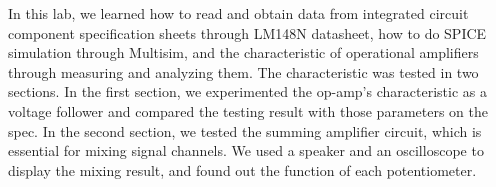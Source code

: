 In this lab, we learned how to read and obtain data from integrated circuit component specification sheets through LM148N datasheet, how to do SPICE simulation through Multisim, and the characteristic of operational amplifiers through measuring and analyzing them. \newline
\phantom{ } The characteristic was tested in two sections. In the first section, we experimented the op-amp's characteristic as a voltage follower and compared the testing result with those parameters on the spec. In the second section, we tested the summing amplifier circuit, which is essential for mixing signal channels. We used a speaker and an oscilloscope to display the mixing result, and found out the function of each potentiometer.
